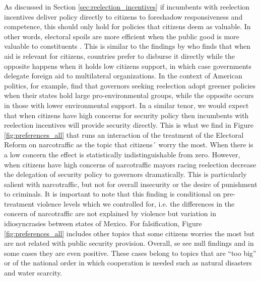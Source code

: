 \documentclass[12pt]{amsart}
\numberwithin{equation}{section}
\theoremstyle{definition}
\theoremstyle{definition}
\theoremstyle{definition}
\begin{document}
As discussed in Section \ref{sec:reelection_incentives} if incumbents with reelection incentives deliver policy directly to citizens to foreshadow responsiveness and competence, this should only hold for policies that citizens deem as valuable. In other words, electoral spoils are more efficient when the public good is more valuable to constituents \citep{lizzeri_2001}. This is similar to the findings by \citet{milner_2004} who finds that when aid is relevant for citizens, countries prefer to disburse it directly while the opposite happens when it holds low citizens support, in which case governments delegate foreign aid to multilateral organizations. In the context of American politics, for example, \citet{list_sturm_2006} find that governors seeking reelection adopt greener policies when their states hold large pro-environmental groups, while the opposite occurs in those with lower environmental support. In a similar tenor, we would expect that when citizens have high concerns for security policy then incumbents with reelection incentives will provide security directly. This is what we find in Figure \ref{fig:preferences_all} that runs an interaction of the treatment of the Electoral Reform on narcotraffic as the topic that citizens´ worry the most. When there is a low concern the effect is statistically indistinguishable from zero. However, when citizens have high concerns of narcotraffic mayors racing reelection decrease the delegation of security policy to governors dramatically. This is particularly salient with narcotraffic, but not for overall insecurity or the desire of punishment to criminals. It is important to note that this finding is conditional on    pre-treatment violence levels which we controlled for, i.e. the differences in the concern of narcotraffic are not explained by violence but variation in idiosyncrasies between states of Mexico. For falsification,  Figure \ref{fig:preferences_all} includes other topics that some citizens worries the most but are not related with public security provision. Overall, se see null findings and in some cases they are even positive. These cases belong to topics that are ``too big'' or of the national order in which cooperation is needed such as natural disasters and water scarcity. 
 
\end{document}

